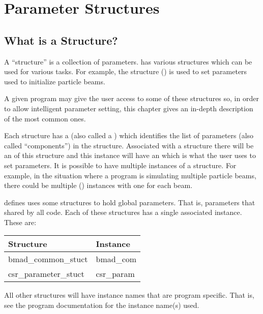 \chapter{Parameter Structures}
\label{c:param.structs}

\section{What is a Structure?}
\label{s:struct}

A ``structure'' is a collection of parameters.  \bmad has various
structures which can be used for various tasks. For example, the
 structure () is used to set
parameters used to initialize particle beams.

A given program may give the user access to some of these structures
so, in order to allow intelligent parameter setting, this chapter
gives an in-depth description of the most common ones.

Each structure has a  (also called a ) which identifies the list of parameters (also called
``components'') in the structure. Associated with a structure there
will be an  of this structure and this instance will
have an  which is what the user uses to set
parameters. It is possible to have multiple instances of a
structure. For example, in the situation where a program is simulating
multiple particle beams, there could be multiple 
() instances with one for each beam.

\bmad defines uses some structures to hold global parameters. That is,
parameters that shared by all code. Each of these structures has
a single associated instance. These are:
\begin{center}
  \begin{tabular}{ll} \toprule
  Structure           & Instance    \\
  \midrule
  bmad_common_stuct   & bmad_com    \\
  csr_parameter_stuct & csr_param   \\
  \bottomrule
  \end{tabular}
\end{center}
All other structures will have instance names that are program
specific.  That is, see the program documentation for the instance
name(s) used.

